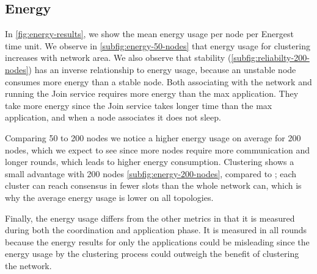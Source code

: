 \subsection{Energy}
In \cref{fig:energy-results}, we show the mean energy usage per node per Energest time unit. We observe in \cref{subfig:energy-50-nodes} that energy usage for clustering increases with network area. We also observe that stability (\cref{subfig:reliabilty-200-nodes}) has an inverse relationship to energy usage, because an unstable node consumes more energy than a stable node. Both associating with the network and running the Join service requires more energy than the max application. They take more energy since the Join service takes longer time than the max application, and when a node associates it does not sleep.

Comparing 50 to 200 nodes we notice a higher energy usage on average for 200 nodes, which we expect to see since more nodes require more communication and longer rounds, which leads to higher energy consumption. Clustering shows a small advantage with 200 nodes \cref{subfig:energy-200-nodes}, compared to \atwo{}; each cluster can reach consensus in fewer slots than the whole network can, which is why the average energy usage is lower on all topologies.

Finally, the energy usage differs from the other metrics in that it is measured during both the coordination and application phase.  It is measured in all rounds because the energy results for only the applications could be misleading since the energy usage by the clustering process could outweigh the benefit of clustering the network.

